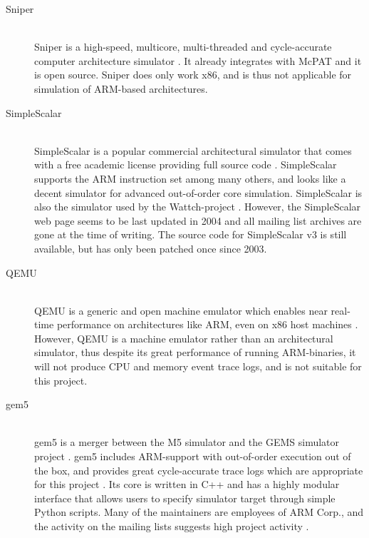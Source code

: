 \begin{description}
\item[Sniper] \hfill\\
    Sniper is a high-speed, multicore, multi-threaded and cycle-accurate
    computer architecture simulator
    \cite{sniperwebpage,carlson2011sniper,carlson2013ssomta}. It already integrates
    with McPAT and it is open source. Sniper does only work x86, and is thus not
    applicable for simulation of ARM-based architectures.

\item[SimpleScalar] \hfill\\
    SimpleScalar is a popular commercial architectural simulator that comes with
    a free academic license providing full source code
    \cite{burger1996evaluating,manjikian2001multiprocessor,austin2002simplescalar}.
    SimpleScalar supports the ARM instruction set among many others, and looks
    like a decent simulator for advanced out-of-order core simulation.
    SimpleScalar is also the simulator used by the Wattch-project
    \cite{brooks2000wattch}. However, the SimpleScalar web page seems to be last
    updated in 2004 and all mailing list archives are gone at the time of
    writing. The source code for SimpleScalar v3 is still available, but has
    only been patched once since 2003.

\item[QEMU]\hfill\\
    QEMU is a generic and open machine emulator which enables near real-time
    performance on architectures like ARM, even on x86 host machines
    \cite{bartholomew2006qemu,shen2010full,bellard2005qemu}. However, QEMU is a
    machine emulator rather than an architectural simulator, thus despite its great
    performance of running ARM-binaries, it will not produce CPU and memory event
    trace logs, and is not suitable for this project.

\item[gem5]\hfill\\
    gem5 is a merger between the M5 simulator \cite{binkert2006m5} and the GEMS
    simulator project \cite{GEMS}. gem5 includes ARM-support with out-of-order
    execution out of the box, and provides great cycle-accurate trace logs which
    are appropriate for this project \cite{gem5simulator}. Its core is written
    in C++ and has a highly modular interface that allows users to specify
    simulator target through simple Python scripts. Many of the maintainers are
    employees of ARM Corp., and the activity on the mailing lists suggests high
    project activity \cite{gem5dev}.
\end{description}

